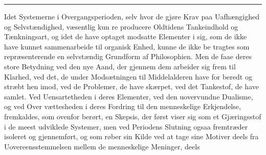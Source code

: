 \documentclass[12pt,a4paper]{book}
\newcommand{\divrule}{\begin{center}\rule{2cm}{0.4pt}\end{center}}
\begin{document}
\divrule

Idet Systemerne i Overgangsperioden, selv hvor de gjøre
Krav paa Uafhængighed og Selvstændighed, væsentlig kun re\-%
producere Oldtidens Tankeindhold og Tænkningsart, og idet de
have optaget modsatte Elementer i sig, som de ikke have
kunnet sammenarbeide til organisk Enhed, kunne de ikke be\-%
tragtes som repræsenterende en selvstændig Grundform af
Philosophien. Men de faae deres store Betydning ved den
nye Aand, der gjennem dem arbeider sig frem til Klarhed,
ved det, de under Modsætningen til Middelalderen have for\-%
beredt og stræbt hen imod, ved de Problemer, de have skærpet,
ved det Tankestof, de have samlet. Ved Uensartetheden i
deres Elementer, ved den uovervundne Dualisme, og ved Over\-%
vættesheden i deres Fordring til den menneskelige Erkjendelse,
fremkaldes, som ovenfor berørt, en Skepsis, der først viser sig
som et Gjæringsstof i de meest udviklede Systemer, men ved
Periodens Slutning ogsaa fremtræder isoleret og gjennemført,
og som røber sin Kilde ved at tage sine Motiver deels fra
Uovereensstemmelsen mellem de menneskelige Meninger, deels
\end{document}

